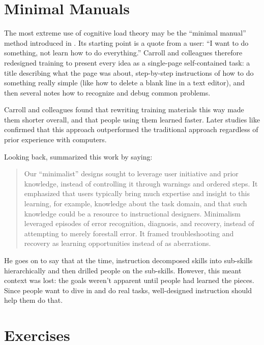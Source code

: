 \section{Minimal Manuals}\label{s:load-minimal}

The most extreme use of cognitive load theory may be the ``minimal
manual'' method introduced in \cite{Carr1987}. Its starting point is
a quote from a user: ``I want to do something, not learn how to do
everything.'' Carroll and colleagues therefore redesigned training to
present every idea as a single-page self-contained task: a title
describing what the page was about, step-by-step instructions of how to
do something really simple (like how to delete a blank line in a text
editor), and then several notes how to recognize and debug common
problems.

Carroll and colleagues found that rewriting training materials this way
made them shorter overall, and that people using them learned faster.
Later studies like \cite{Lazo1993} confirmed that this approach
outperformed the traditional approach regardless of prior experience
with computers.

Looking back, \cite{Carr2014} summarized this work by saying:

\begin{quote}

Our ``minimalist'' designs sought to leverage user initiative and prior
knowledge, instead of controlling it through warnings and ordered
steps. It emphasized that users typically bring much expertise and
insight to this learning, for example, knowledge about the task
domain, and that such knowledge could be a resource to instructional
designers. Minimalism leveraged episodes of error recognition,
diagnosis, and recovery, instead of attempting to merely forestall
error. It framed troubleshooting and recovery as learning
opportunities instead of as aberrations.

\end{quote}

He goes on to say that at the time, instruction decomposed skills into
sub-skills hierarchically and then drilled people on the sub-skills.
However, this meant context was lost: the goals weren't apparent until
people had learned the pieces. Since people want to dive in and do real
tasks, well-designed instruction should help them do that.

\section{Exercises}\label{s:load-exercises}

